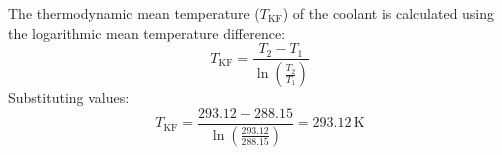 The thermodynamic mean temperature (\( T_{\text{KF}} \)) of the coolant is calculated using the logarithmic mean temperature difference:  
\[
T_{\text{KF}} = \frac{T_2 - T_1}{\ln\left(\frac{T_2}{T_1}\right)}
\]  
Substituting values:  
\[
T_{\text{KF}} = \frac{293.12 - 288.15}{\ln\left(\frac{293.12}{288.15}\right)} = 293.12 \, \text{K}
\]